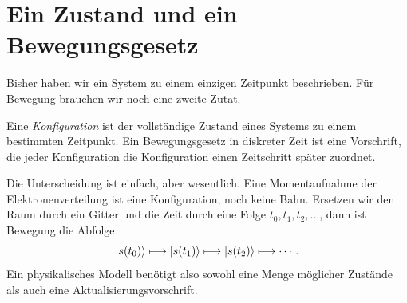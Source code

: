 \begin{classroomqa}
\end{classroomqa}

\begin{classroomqa}
\end{classroomqa}

\section{Ein Zustand und ein Bewegungsgesetz}

Bisher haben wir ein System zu einem einzigen Zeitpunkt beschrieben. Für Bewegung brauchen wir noch eine zweite Zutat.

\begin{definition}Eine \emph{Konfiguration} ist der vollständige Zustand eines Systems zu einem bestimmten Zeitpunkt. Ein Bewegungsgesetz in diskreter Zeit ist eine Vorschrift, die jeder Konfiguration die Konfiguration einen Zeitschritt später zuordnet.\end{definition}

Die Unterscheidung ist einfach, aber wesentlich. Eine Momentaufnahme der Elektronenverteilung ist eine Konfiguration, noch keine Bahn. Ersetzen wir den Raum durch ein Gitter und die Zeit durch eine Folge \(t_0,t_1,t_2,\ldots\), dann ist Bewegung die Abfolge
\begin{equation}
  \left\lvert s(t_0)\right\rangle
  \longmapsto
  \left\lvert s(t_1)\right\rangle
  \longmapsto
  \left\lvert s(t_2)\right\rangle
  \longmapsto\cdots.
  \label{eq:l01-discrete-motion}
\end{equation}
Ein physikalisches Modell benötigt also sowohl eine Menge möglicher Zustände als auch eine Aktualisierungsvorschrift.

